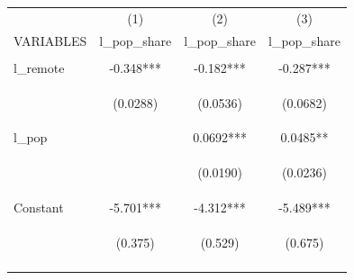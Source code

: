\documentclass{article}
\begin{document}
\begin{table}
    \centering
    \begin{tabular}{lccc} \hline
     & (1) & (2) & (3) \\
    VARIABLES & l\_pop\_share & l\_pop\_share & l\_pop\_share \\ \hline
    \vspace{4pt} & \begin{footnotesize}\end{footnotesize} & \begin{footnotesize}\end{footnotesize} & \begin{footnotesize}\end{footnotesize} \\
    l\_remote & -0.348*** & -0.182*** & -0.287*** \\
    \vspace{4pt} & \begin{footnotesize}(0.0288)\end{footnotesize} & \begin{footnotesize}(0.0536)\end{footnotesize} & \begin{footnotesize}(0.0682)\end{footnotesize} \\
    l\_pop &  & 0.0692*** & 0.0485** \\
    \vspace{4pt} & \begin{footnotesize}\end{footnotesize} & \begin{footnotesize}(0.0190)\end{footnotesize} & \begin{footnotesize}(0.0236)\end{footnotesize} \\
    Constant & -5.701*** & -4.312*** & -5.489*** \\
     & \begin{footnotesize}(0.375)\end{footnotesize} & \begin{footnotesize}(0.529)\end{footnotesize} & \begin{footnotesize}(0.675)\end{footnotesize} \\
    \vspace{4pt} & \begin{footnotesize}\end{footnotesize} & \begin{footnotesize}\end{footnotesize} & \begin{footnotesize}\end{footnotesize} \\

\end{tabular}
\end{table}
\end{document}
